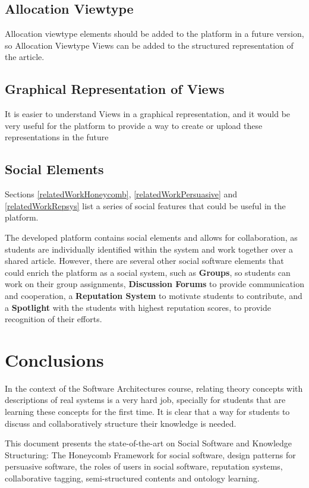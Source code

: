\documentclass{llncs}
\begin{document}
\subsection{Allocation Viewtype}
Allocation viewtype elements should be added to the platform in a future version, so Allocation Viewtype Views can be added to the structured representation of the article.

\subsection{Graphical Representation of Views}
It is easier to understand Views in a graphical representation, and it would be very useful for the platform to provide a way to create or upload these representations in the future

\subsection{Social Elements}
Sections \ref{relatedWorkHoneycomb}, \ref{relatedWorkPersuasive} and  \ref{relatedWorkRepsys} list a series of social features that could be useful in the platform.

The developed platform contains social elements and allows for collaboration, as students are individually identified within the system and work together over a shared article. However, there are several other social software elements that could enrich the platform as a social system, such as \textbf{Groups}, so students can work on their group assignments, \textbf{Discussion Forums} to provide communication and cooperation, a \textbf{Reputation System} to motivate students to contribute, and a \textbf{Spotlight} with the students with highest reputation scores, to provide recognition of their efforts.

\section{Conclusions}

In the context of the Software Architectures course, relating theory concepts with descriptions of real systems is a very hard job, specially for students that are learning these concepts for the first time. It is clear that a way for students to discuss and collaboratively structure their knowledge is needed.

This document presents the state-of-the-art on Social Software and Knowledge Structuring: The Honeycomb Framework for social software, design patterns for persuasive software, the roles of users in social software, reputation systems, collaborative tagging, semi-structured contents and ontology learning.
\end{document}
